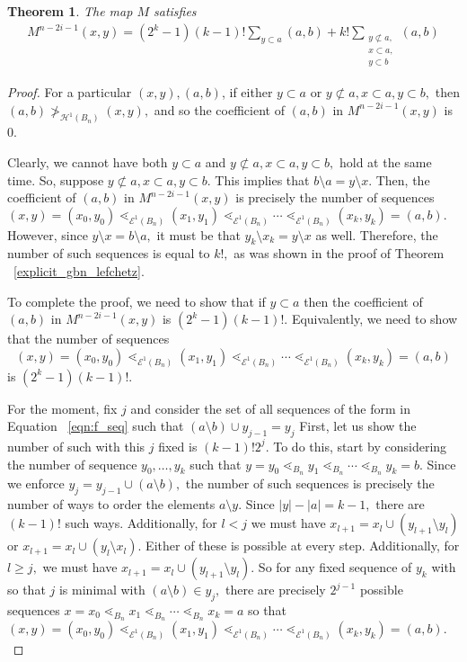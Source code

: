 \documentclass[10 pt]{amsart}
\theoremstyle{plain}
\newtheorem{thm}{Theorem}[section]
\theoremstyle{definition}
\theoremstyle{remark}
\numberwithin{equation}{section}
\begin{document}
\begin{thm}
The map $M$ satisfies 
\begin{align*}
	M^{n-2i-1}(x, y) = (2^k - 1)(k-1)!\sum_{y \subset a}^{}(a, b) +k! \sum_{\substack{{y \not \subset a,}\\{x\subset a,}\\{y \subset b}}}^{}(a, b)
\end{align*}
\end{thm}
\begin{proof}

For a particular $(x, y),(a , b)$, if either $y \subset a$ or $y \not \subset a, x\subset a, y\subset b,$ then $(a, b) \not >_{\mathcal H^1(B_n)} (x, y),$ and so the coefficient of $(a, b)$ in $M^{n-2i-1}(x, y)$ is 0.

Clearly, we cannot have both $y \subset a$ and $y \not \subset a, x\subset a, y\subset b,$ hold at the same time. So, suppose  $y \not \subset a, x\subset a, y\subset b.$ This implies that $b\setminus a = y\setminus x.$ Then, the coefficient of $(a, b)$ in $M^{n-2i-1}(x, y)$ is precisely the number of sequences $(x, y) = (x_0, y_0) \lessdot_{\mathcal E^1(B_n)} (x_1, y_1) \lessdot_{\mathcal E^1(B_n)}  \cdots \lessdot_{\mathcal E^1(B_n)}  (x_k, y_k) = (a, b).$ However, since $y \setminus x = b\setminus a,$ it must be that $y_k \setminus x_k = y\setminus x$ as well. Therefore, the number of such sequences is equal to $k!,$ as was shown in the proof of Theorem ~\ref{explicit_gbn_lefchetz}.

To complete the proof, we need to show that if $y \subset a$ then the coefficient of $(a, b)$ in $M^{n-2i-1}(x, y)$ is $(2^k - 1)(k-1)!$. Equivalently, we need to show that the number of sequences 
\begin{equation}
\label{eqn:f_seq}
(x, y) = (x_0, y_0) \lessdot_{\mathcal E^1(B_n)} (x_1, y_1) \lessdot_{\mathcal E^1(B_n)}  \cdots \lessdot_{\mathcal E^1(B_n)}  (x_k, y_k) = (a, b)
\end{equation}
is $(2^k - 1)(k-1)!.$

For the moment, fix $j$ and consider the set of all sequences of the form in Equation ~\eqref{eqn:f_seq} such that $(a\setminus b) \cup y_{j-1} = y_j$ First, let us show the number of such with this $j$ fixed is $(k-1)!2^j.$ To do this, start by considering the number of sequence $y_0,\ldots, y_k$ such that $y=y_0 \lessdot_{B_n} y_1 \lessdot_{B_n} \cdots \lessdot_{B_n} y_k = b.$ Since we enforce $y_j = y_{j-1} \cup (a \setminus b),$ the number of such sequences is precisely the number of ways to order the elements $a \setminus y.$ Since $|y| - |a| = k-1,$ there are $(k-1)!$ such ways. Additionally, for $l <j$ we must have $x_{l+1} = x_l \cup (y_{l+1} \setminus y_l)$ or $x_{l+1} = x_l \cup (y_l \setminus x_l).$ 
Either of these is possible at every step. Additionally, for $l \geq j,$ we must have $x_{l+1} = x_l \cup (y_{l+1} \setminus y_l).$ So for any fixed sequence of $y_k$ with so that $j$ is minimal with $(a\setminus b) \in y_j,$ 
there are precisely $2^{j-1}$ possible sequences $x=x_0 \lessdot_{B_n} x_1 \lessdot_{B_n} \cdots \lessdot_{B_n} x_k = a$
so that $(x, y) = (x_0, y_0) \lessdot_{\mathcal E^1(B_n)} (x_1, y_1) \lessdot_{\mathcal E^1(B_n)}  \cdots \lessdot_{\mathcal E^1(B_n)}  (x_k, y_k) = (a, b).$


\end{proof}
\end{document}
